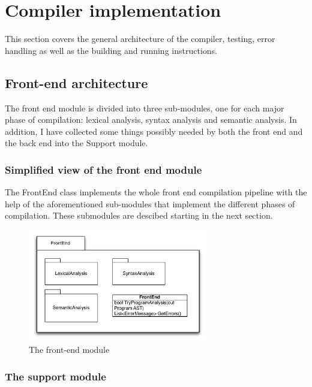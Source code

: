\documentclass[a4paper,11pt]{article}
\begin{document}
\newpage
\section{Compiler implementation}

This section covers the general architecture of the compiler, testing, error handling as well as the building and running instructions.

\subsection{Front-end architecture}

The front end module is divided into three sub-modules, one for each major phase of compilation: lexical analysis, syntax analysis and semantic analysis. In addition, I have collected some things possibly needed by both the front end and the back end into the Support module.

\subsubsection{Simplified view of the front end module}

The FrontEnd class implements the whole front end compilation pipeline with the help of the aforementioned sub-modules that implement the different phases of compilation. These submodules are descibed starting in the next section.

\begin{figure}[h!]
\centering
\includegraphics[width=0.7\textwidth]{frontend.pdf}
\caption{The front-end module}
\end{figure}

\subsubsection{The support module} \label{support}
\end{document}
